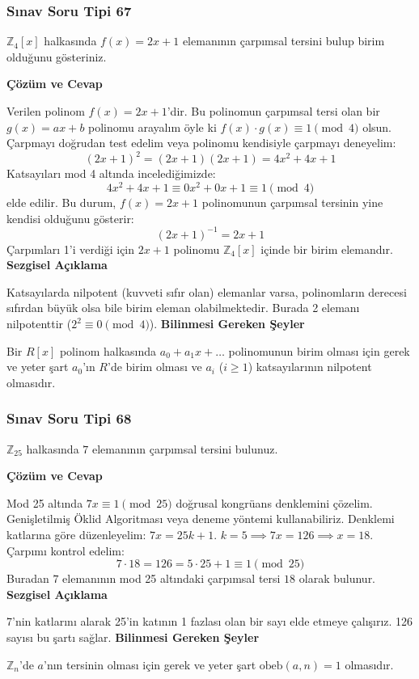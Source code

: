 \documentclass[11pt, a4paper]{article}
\newenvironment{cozum}{
    \vspace{0.5cm}
    \noindent\textcolor{green!60!black}{\faCheckCircle\enspace \textbf{\Large Çözüm ve Cevap}}\par\vspace{0.2cm}
}{}
\newenvironment{sezgisel}{
    \vspace{0.5cm}
    \noindent\textcolor{orange!80!black}{\faLightbulb\enspace \textbf{\Large Sezgisel Açıklama}}\par\vspace{0.2cm}
    \itshape
}{}
\newenvironment{bilgi}{
    \vspace{0.5cm}
    \noindent\textcolor{red!70!black}{\faExclamationTriangle\enspace \textbf{\Large Bilinmesi Gereken Şeyler}}\par\vspace{0.2cm}
}{}
\begin{document}
\subsubsection{Sınav Soru Tipi 67}
\begin{sinavbox}
$\mathbb{Z}_{4}[x]$ halkasında $f(x) = 2x+1$ elemanının çarpımsal tersini bulup birim olduğunu gösteriniz.
\end{sinavbox}
\begin{cozum}
Verilen polinom $f(x) = 2x+1$'dir. Bu polinomun çarpımsal tersi olan bir $g(x) = ax+b$ polinomu arayalım öyle ki $f(x) \cdot g(x) \equiv 1 \pmod 4$ olsun.
Çarpmayı doğrudan test edelim veya polinomu kendisiyle çarpmayı deneyelim:
\[ (2x+1)^2 = (2x+1)(2x+1) = 4x^2 + 4x + 1 \]
Katsayıları mod 4 altında incelediğimizde:
\[ 4x^2 + 4x + 1 \equiv 0x^2 + 0x + 1 \equiv 1 \pmod 4 \]
elde edilir.
Bu durum, $f(x) = 2x+1$ polinomunun çarpımsal tersinin yine kendisi olduğunu gösterir:
\[ (2x+1)^{-1} = 2x+1 \]
Çarpımları 1'i verdiği için $2x+1$ polinomu $\mathbb{Z}_4[x]$ içinde bir birim elemandır.
\end{cozum}
\begin{sezgisel}
Katsayılarda nilpotent (kuvveti sıfır olan) elemanlar varsa, polinomların derecesi sıfırdan büyük olsa bile birim eleman olabilmektedir. Burada 2 elemanı nilpotenttir ($2^2 \equiv 0 \pmod 4$).
\end{sezgisel}
\begin{bilgi}
Bir $R[x]$ polinom halkasında $a_0 + a_1 x + \dots$ polinomunun birim olması için gerek ve yeter şart $a_0$'ın $R$'de birim olması ve $a_i$ ($i \ge 1$) katsayılarının nilpotent olmasıdır.
\end{bilgi}

\newpage
\subsubsection{Sınav Soru Tipi 68}
\begin{sinavbox}
$\mathbb{Z}_{25}$ halkasında $7$ elemanının çarpımsal tersini bulunuz.
\end{sinavbox}
\begin{cozum}
Mod 25 altında $7x \equiv 1 \pmod{25}$ doğrusal kongrüans denklemini çözelim.
Genişletilmiş Öklid Algoritması veya deneme yöntemi kullanabiliriz.
Denklemi katlarına göre düzenleyelim:
$7x = 25k + 1$.
$k=5 \implies 7x=126 \implies x=18$.
Çarpımı kontrol edelim:
\[ 7 \cdot 18 = 126 = 5 \cdot 25 + 1 \equiv 1 \pmod{25} \]
Buradan $7$ elemanının mod 25 altındaki çarpımsal tersi $18$ olarak bulunur.
\end{cozum}
\begin{sezgisel}
7'nin katlarını alarak 25'in katının 1 fazlası olan bir sayı elde etmeye çalışırız. 126 sayısı bu şartı sağlar.
\end{sezgisel}
\begin{bilgi}
$\mathbb{Z}_n$'de $a$'nın tersinin olması için gerek ve yeter şart $\text{obeb}(a, n) = 1$ olmasıdır.
\end{bilgi}
\end{document}
